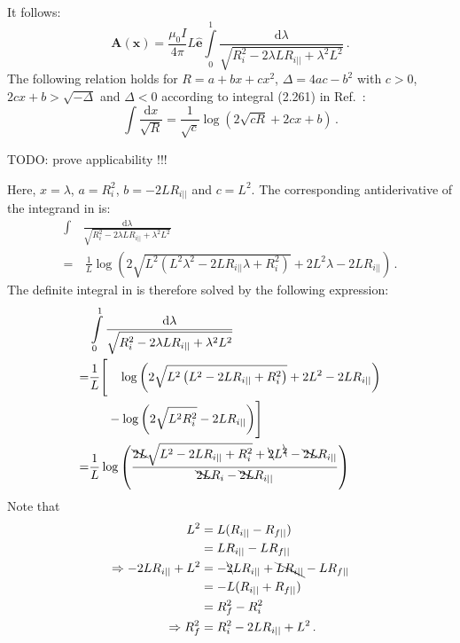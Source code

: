 It follows:
\begin{equation}
 \mathbf{A}(\mathbf{x})
 = \frac{\mu_0 I}{4 \pi} L \hat{\mathbf{e}} \int\limits_0^1 \frac{\mathrm{d}\lambda}{\sqrt{R_i^2 - 2 \lambda L R_{i ||} + \lambda^2 L^2}} \, . \label{eqn:A_integral}
\end{equation}
The following relation holds for
$R = a + bx + cx^2$,
$\Delta = 4 a c - b^2$ with
$c > 0$, $2 c x + b > \sqrt{- \Delta}$ and $\Delta < 0$
according to integral (2.261) in Ref.~\cite{gradshteyn_ryzhik}:
\begin{equation}
 \int \frac{\mathrm{d}x}{\sqrt{R}} = \frac{1}{\sqrt{c}} \log \left( 2 \sqrt{c R} + 2 c x + b \right) \, .
\end{equation}

{\color{red}
TODO: prove applicability !!!
}

Here, $x = \lambda$, $a=R_i^2$, $b=-2 L R_{i ||}$ and $c = L^2$.
The corresponding antiderivative of the integrand in  is:
\begin{align}
 \int&\frac{\mathrm{d}\lambda}{\sqrt{R_i^2 - 2 \lambda L R_{i ||} + \lambda^2 L^2}} \nonumber \\
 =&\, \frac{1}{L} \log \left( 2 \sqrt{L^2\left( L^2 \lambda^2 - 2 L R_{i ||} \lambda + R_i^2 \right)} + 2 L^2 \lambda - 2 L R_{i ||} \right) \, .
\end{align}
The definite integral in  is therefore solved by the following expression:
\begin{align}
 ~ & \int\limits_0^1 \frac{\mathrm{d}\lambda}{\sqrt{R_i^2 - 2 \lambda L R_{i ||} + \lambda^2 L^2}} \\
 = & \frac{1}{L} \Biggl[\phantom{-}\, \log \left( 2 \sqrt{L^2\left( L^2 - 2 L R_{i ||} + R_i^2 \right)} + 2 L^2 - 2 L R_{i ||} \right) \nonumber \\
 ~ & \phantom{\frac{1}{L} \Biggl[} - \log \left( 2 \sqrt{L^2 R_i^2 } - 2 L R_{i ||} \right) \Biggr] \\
 = & \frac{1}{L} \log \left( \frac{ \bcancel{2 L} \sqrt{L^2 - 2 L R_{i ||} + R_i^2} + \bcancel{2} L^{\bcancel{2}} - \bcancel{2 L} R_{i ||} }{ \bcancel{2 L} R_i - \bcancel{2 L} R_{i ||} } \right)
\end{align}
Note that
\begin{align}
                             L^2 & = L (R_{i ||} - R_{f ||} ) \\
                              ~  & = L R_{i ||} - L R_{f ||} \\
\Rightarrow -2 L R_{i ||} + L^2  & = - \bcancel{2} L R_{i ||}  + \bcancel{L R_{i ||}} - L R_{f ||} \\
                              ~  & = -L (R_{i ||} + R_{f ||} ) \\
                              ~  & = R_f^2 - R_i^2 \\
\Rightarrow                R_f^2 & = R_i^2 -2 L R_{i ||} + L^2 \, .
\end{align}
